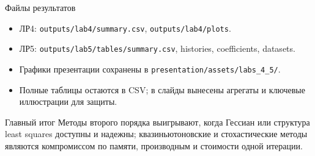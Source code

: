 \documentclass[10pt,aspectratio=169]{beamer}
\begin{document}
\begin{frame}{Файлы результатов}
\begin{itemize}
    \item ЛР4: \texttt{outputs/lab4/summary.csv}, \texttt{outputs/lab4/plots}.
    \item ЛР5: \texttt{outputs/lab5/tables/summary.csv}, histories, coefficients, datasets.
    \item Графики презентации сохранены в \texttt{presentation/assets/labs\_4\_5/}.
    \item Полные таблицы остаются в CSV; в слайды вынесены агрегаты и ключевые иллюстрации для защиты.
\end{itemize}

\begin{block}{Главный итог}
Методы второго порядка выигрывают, когда Гессиан или структура least squares доступны и надежны; квазиньютоновские и стохастические методы являются компромиссом по памяти, производным и стоимости одной итерации.
\end{block}
\end{frame}
\end{document}
